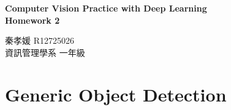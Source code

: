 \documentclass[10pt,a4paper]{article}
\begin{document}
\title{}
\author{}


\begin{center}
\textbf{\Large Computer Vision Practice with Deep Learning \\[5pt]
Homework 2}

秦孝媛 R12725026 \\
資訊管理學系 一年級
\end{center}

\section*{Generic Object Detection}
\end{document}
